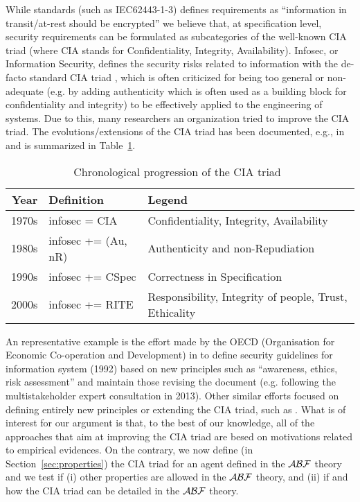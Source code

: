 While standards (such
as IEC62443-1-3) defines requirements as
``information in transit/at-rest should be encrypted'' we believe that, at
specification level, security requirements can be formulated as subcategories of
the well-known CIA triad (where CIA stands for Confidentiality, Integrity,
Availability).
Infosec, or Information Security, defines the security risks related to
information with the de-facto standard CIA triad , which is often criticized
\autocite{CIAcriticismCPS} for being too general or non-adequate (e.g. by
adding authenticity which is often used as a building block for confidentiality
and integrity) to be effectively applied to the engineering of systems. Due to
this, many researchers an organization tried to improve the CIA triad.  The
evolutions/extensions of the CIA triad has been documented, e.g., in
\autocite{Samonas2014cia} and is summarized in Table~\ref{tab:ciaevolution}.

\begin{table}[h]
\centering
\small
\begin{tabular}{rll} 
	{\bf Year} & {\bf Definition} & {\bf Legend}\\
	\hline
	1970s & infosec = CIA & Confidentiality, Integrity, Availability\\
	1980s & infosec += (Au, nR) & Authenticity and non-Repudiation\\
	1990s & infosec += CSpec & Correctness in Specification\\
	2000s & infosec += RITE & Responsibility, Integrity of people, Trust, Ethicality
\end{tabular}
\caption{Chronological progression of the CIA triad~\label{tab:ciaevolution}}
\end{table}


An representative example is the effort made by the OECD (Organisation for Economic
Co-operation and Development) in \autocite{OECD2013guidelines} to define
security guidelines for information system (1992) based on new principles such
as ``awareness, ethics, risk assessment'' and maintain those revising the
document (e.g.  following the multistakeholder expert consultation in 2013).
Other similar efforts focused on defining entirely new principles or extending
the CIA triad, such as \autocite{NISTSP800-160}. What is of interest for our
argument is that, to the best of our knowledge, all of the approaches that aim
at improving the CIA triad are besed on motivations related to empirical evidences. On the contrary,
we now define (in Section~\ref{sec:properties}) the CIA triad for an agent
defined in the $\mathcal{A}\mathcal{B}\mathcal{F}$ theory and we test if (i) other properties are
allowed in the $\mathcal{A}\mathcal{B}\mathcal{F}$ theory, and (ii) if and how the CIA triad can be
detailed in the $\mathcal{A}\mathcal{B}\mathcal{F}$ theory.

